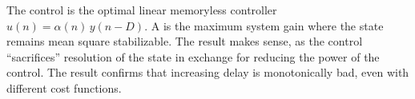 \documentclass[11pt]{article}
\begin{document}
The control is the optimal linear memoryless controller $u(n) = \alpha(n) \, y(n-D)$. A is the maximum system gain where the state remains mean square stabilizable. The result makes sense, as the control ``sacrifices'' resolution of the state in exchange for reducing the power of the control. The result confirms that increasing delay is monotonically bad, even with different cost functions.



%
%
\end{document}
